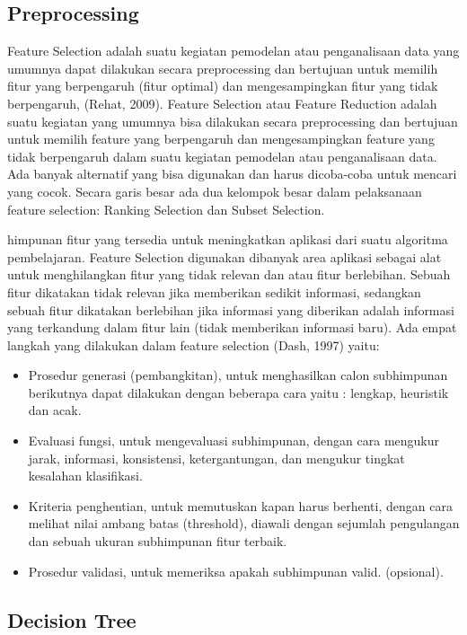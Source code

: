 \documentclass[conference]{IEEEtran}
\begin{document}
\subsection{Preprocessing}
Feature Selection adalah suatu kegiatan pemodelan atau penganalisaan data yang umumnya dapat dilakukan secara preprocessing dan bertujuan untuk memilih fitur yang berpengaruh (fitur optimal) dan mengesampingkan fitur yang tidak berpengaruh, (Rehat, 2009). Feature Selection atau Feature Reduction adalah suatu kegiatan yang umumnya bisa dilakukan secara preprocessing dan bertujuan untuk memilih feature yang berpengaruh dan mengesampingkan feature yang tidak berpengaruh dalam suatu kegiatan pemodelan atau penganalisaan data. Ada banyak alternatif yang bisa digunakan dan harus dicoba-coba untuk mencari yang cocok. Secara garis besar ada dua kelompok besar dalam pelaksanaan feature selection: Ranking Selection dan Subset Selection.

himpunan fitur yang tersedia untuk meningkatkan aplikasi dari suatu algoritma pembelajaran. Feature Selection digunakan dibanyak area aplikasi sebagai alat untuk menghilangkan fitur yang tidak relevan dan atau fitur berlebihan. Sebuah fitur dikatakan tidak relevan jika memberikan sedikit informasi, sedangkan sebuah fitur dikatakan berlebihan jika informasi yang diberikan adalah informasi yang terkandung dalam fitur lain (tidak memberikan informasi baru).
Ada empat langkah yang dilakukan dalam feature selection (Dash, 1997) yaitu:

\begin{itemize}
\item Prosedur generasi (pembangkitan), untuk menghasilkan calon subhimpunan berikutnya dapat dilakukan dengan beberapa cara yaitu : lengkap, heuristik dan acak.
\item Evaluasi fungsi, untuk mengevaluasi subhimpunan, dengan cara mengukur jarak, informasi, konsistensi, ketergantungan, dan mengukur tingkat kesalahan klasifikasi.
\item Kriteria penghentian, untuk memutuskan kapan harus berhenti, dengan cara melihat nilai ambang batas (threshold), diawali dengan sejumlah pengulangan dan sebuah ukuran subhimpunan fitur terbaik.
\item Prosedur validasi, untuk memeriksa apakah subhimpunan valid. (opsional).
\end{itemize}

\subsection{Decision Tree}
\end{document}

